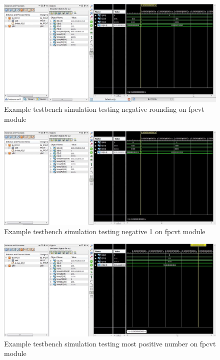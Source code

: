 \documentclass{article}
\begin{document}
\begin{figure}[H]
	\begin{center}
		\includegraphics[width=1.2\textwidth]{sim4.png} 
		\caption{Example testbench simulation testing negative rounding on fpcvt module}
	\end{center}
\end{figure}

\begin{figure}[H]
	\begin{center}
		\includegraphics[width=1.2\textwidth]{sim7.png} 
		\caption{Example testbench simulation testing negative 1 on fpcvt module}
	\end{center}
\end{figure}

\begin{figure}[H]
	\begin{center}
		\includegraphics[width=1.2\textwidth]{mostPositiveSim.png} 
		\caption{Example testbench simulation testing most positive number on fpcvt module}
	\end{center}
\end{figure}
\end{document}
